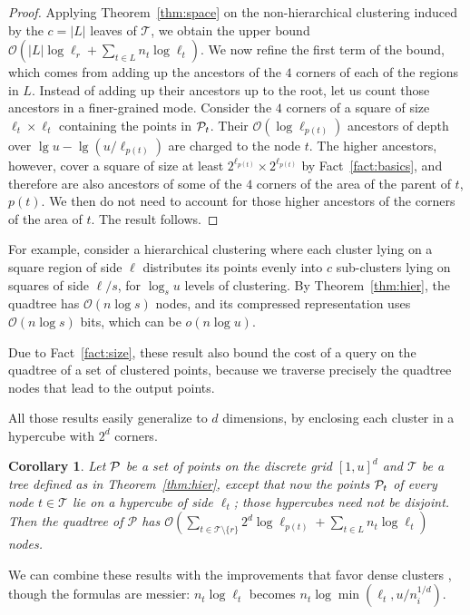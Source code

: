 \documentclass{elsarticle}
\newtheorem{corollary}[theorem]{Corollary}
\newcommand{\Oh}[1]
  {\ensuremath{\mathcal{O}\!\left( {#1} \right)}}
\begin{document}
\begin{proof}
Applying Theorem~\ref{thm:space} on the non-hierarchical clustering induced by the $c=|L|$ leaves of $\mathcal{T}$, we obtain the upper bound
$\Oh{|L| \log \ell_r + \sum_{t \in L} n_t \log \ell_t}$. We now refine the first term of the bound, which comes from adding up the ancestors of the $4$ corners of each of the regions in $L$. Instead of adding up their ancestors up to the root, let us count those ancestors in a finer-grained mode. Consider the $4$ corners of a square of size $\ell_t \times \ell_t$ containing the points in ${\cal P}_t$. Their $\Oh{\log \ell_{p(t)}}$ ancestors of depth over $\lg u - \lg(u/\ell_{p(t)})$ are charged to the node $t$. The higher ancestors, however, cover a square of size at least $2^{\ell_{p(t)}} \times 2^{\ell_{p(t)}}$ by Fact~\ref{fact:basics}, and therefore are also ancestors of some of the $4$ corners of the area of the parent of $t$, $p(t)$. We then do not need to account for those higher ancestors of the corners of the area of $t$. The result follows.
\end{proof}

For example, consider a hierarchical clustering where each cluster lying on a square region of side $\ell$ distributes its points evenly into $c$ sub-clusters lying on squares of side $\ell/s$, for $\log_s u$ levels of clustering. By Theorem~\ref{thm:hier}, the quadtree has $\Oh{n\log s}$ nodes, and its compressed representation uses $\Oh{n\log s}$ bits, which can be $o(n\log u)$.


Due to Fact~\ref{fact:size}, these result also bound the cost of a query on the quadtree of a set of clustered points, because we traverse precisely the quadtree nodes that lead to the output points.

All those results easily generalize to $d$ dimensions, by enclosing each cluster in a hypercube with $2^d$ corners.

\begin{corollary} 
Let ${\cal P}$ be a set of points on the discrete grid $[1,u]^d$ and 
$\mathcal{T}$ be a tree defined as in Theorem~\ref{thm:hier}, except that
now the points ${\cal P}_t$ of every node $t \in \mathcal{T}$ lie on a 
hypercube of side $\ell_t$; those hypercubes need not be disjoint.
Then the quadtree of $\mathcal{P}$ has 
$\Oh{\sum_{t \in \mathcal{T} \setminus \{r\}} 2^d \log \ell_{p(t)} + \sum_{t \in L} n_t \log \ell_t}$ nodes.
\end{corollary}

We can combine these results with the improvements that favor dense clusters \cite{Nav16}, though the formulas are messier: $n_t \log \ell_t$ becomes $n_t\log\min(\ell_t,u/n_i^{1/d})$.
\end{document}
